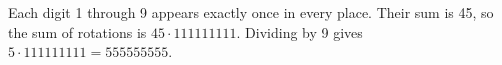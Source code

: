 Each digit 1 through 9 appears exactly once in every place. Their sum is 45, so the sum of rotations is $ 45\cdot111111111 $. Dividing by 9 gives $ 5\cdot111111111=\boxed{555555555}$.
